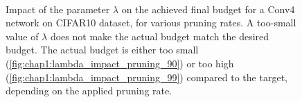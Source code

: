 \begin{figure}
  \centering
  \\
    \caption{ Impact of the parameter $\lambda$ on the achieved final
    budget for a Conv4 network on CIFAR10 dataset, for various pruning rates. A
    too-small value of $\lambda$ does not make the actual budget match the desired
    budget. The actual budget is either too small
    (\cref{fig:chap1:lambda_impact_pruning_90}) or too high
    (\cref{fig:chap1:lambda_impact_pruning_99}) compared to the target, depending
    on the applied pruning rate.}
  \label{fig:chap1:lambda_impact}
  \end{figure}  


